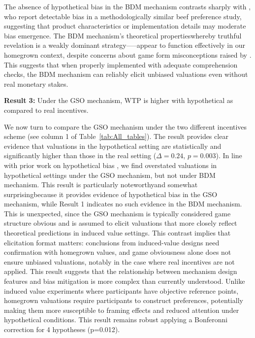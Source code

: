 \documentclass[12pt]{article}
\begin{document}
The absence of hypothetical bias in the BDM mechanism contrasts sharply with \citet{ahles_testing_2024}, who report detectable bias in a methodologically similar beef preference study, suggesting that product characteristics or implementation details may moderate bias emergence.
 The BDM mechanism's theoretical properties\textemdash whereby truthful revelation is a weakly dominant strategy—--appear to function effectively in our homegrown context, despite concerns about game form misconceptions raised by \citet{cason_misconceptions_2014}. This suggests that when properly implemented with adequate comprehension checks, the BDM mechanism can reliably elicit unbiased valuations even without real monetary stakes.



 
\vspace{0.5cm}


\textbf{Result 3:} Under the GSO mechanism, WTP is higher with hypothetical as compared to real incentives. 

We now turn to compare the GSO mechanism under the two different incentives scheme (see column 1 of Table~\ref{tab:All_tables}). The result provides clear evidence that valuations in the hypothetical setting are statistically and significantly higher than those in the real setting (\(\Delta = 0.24\), \(p =0.003\)). 
In line with prior work on hypothetical bias \citep{penn2018understanding, fang_use_2021, ahles_testing_2024}, we find overstated valuations in hypothetical settings under the GSO mechanism, but not under BDM mechanism.  
This result is particularly noteworthy\textemdash and somewhat surprising\textemdash because it provides evidence of hypothetical bias in the GSO mechanism, while Result 1 indicates no such evidence in the BDM mechanism. This is unexpected, since the GSO mechanism is typically considered  game structure obvious  and is assumed to elicit valuations that more closely reflect theoretical predictions in induced value settings. This contrast implies that elicitation format matters: conclusions from induced-value designs need confirmation with homegrown values, and game obviousness alone does not ensure unbiased valuations, notably in the case where real incentives are not applied. This result suggests that the relationship between mechanism design features and bias mitigation is more complex than currently understood. Unlike induced value experiments where participants have objective reference points, homegrown valuations require participants to construct preferences, potentially making them more susceptible to framing effects and reduced attention under hypothetical conditions. This result remains robust applying a Bonferonni correction for 4 hypotheses (p=0.012).
\end{document}
